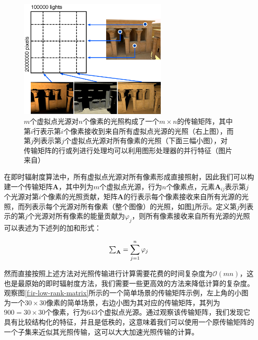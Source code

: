 \begin{figure}
	\sidecaption
	\includegraphics[width=0.65\textwidth]{figures/ir/matrix-interpretation}
	\caption{$m$个虚拟点光源对$n$个像素的光照构成了一个$m\times n$的传输矩阵，其中第$i$行表示第$i$个像素接收到来自所有虚拟点光源的光照（右上图），而第$j$列表示第$j$个虚拟点光源对所有像素的光照（下面三幅小图），对传输矩阵的行或列进行处理均可以利用图形处理器的并行特征（图片来自\cite{a:MatrixRow-ColumnSamplingfortheMany-LightProblem}）}
	\label{f:ir-matrix-interpretation}
\end{figure}

在即时辐射度算法中，所有虚拟点光源对所有像素形成直接照射，因此我们可以构建一个传输矩阵$\mathbf{A}$，其中列为$m$个虚拟点光源，行为$n$个像素点，元素$\mathbf{A}_{ij}$表示第$j$个光源对第$i$个像素的光照贡献，矩阵$\mathbf{A}$的行表示每个像素接收来自所有光源的光照，而列表示每个光源对所有像素（整个图像）的光照，如图\ref{f:ir-matrix-interpretation}所示。定义第$j$列表示的第$j$个光源对所有像素的能量贡献为$\varphi_j$，则所有像素接收来自所有光源的光照可以表述为下述列的加和形式：

\begin{equation}\label{e:ir-column-sum-estimate}
	\mathsmaller\sum\nolimits_{\mathbf{A}}= \sum^{n}_{j=1}\varphi_j
\end{equation}

然而直接按照上述方法对光照传输进行计算需要花费的时间复杂度为$\mathcal{O}(mn)$，这也是最原始的即时辐射度方法，我们需要一些更高效的方法来降低计算的复杂度。观察图\ref{f:ir-low-rank-matrix}所示的一个简单场景的传输矩阵示例，左上角的小图为一个$30\times 30$像素的简单场景，右边小图为其对应的传输矩阵，其列为$900=30\times 30$个像素，行为$643$个虚拟点光源。通过观察该传输矩阵，我们发现它具有比较结构化的特征，并且是低秩的，这意味着我们可以使用一个原传输矩阵的一个子集来近似其光照传输，这可以大大加速光照传输的计算。

